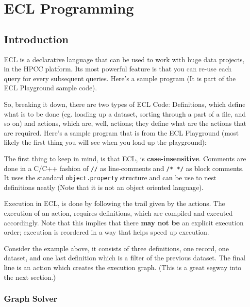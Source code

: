 \part{ECL Programming}

\chapter{Introduction}

ECL is a declarative language that can be used to work with huge data projects, in the HPCC platform. Its most powerful feature is that you can re-use each query for every subsequent queries. Here's a sample program (It is part of the ECL Playground sample code).

So, breaking it down, there are two types of ECL Code: Definitions, which define what is to be done (eg. loading up a dataset, sorting through a part of a file, and so on) and actions, which are, well, actions; they define what are the actions that are required. Here's a sample program that is from the ECL Playground (most likely the first thing you will see when you load up the playground):



The first thing to keep in mind, is that ECL, is \textbf{case-insensitive}. Comments are done in a C/C++ fashion of \lstinline!//! as line-comments and \lstinline!/* */! as block comments. It uses the standard \lstinline!object.property! structure and can be use to nest definitions neatly (Note that it is not an object oriented language).

Execution in ECL, is done by following the trail given by the actions. The execution of an action, requires definitions, which are compiled and executed accordingly. Note that this implies that there \textbf{may not be} an explicit execution order; execution is reordered in a way that helps speed up execution.

Consider the example above, it consists of three definitions, one record, one dataset, and one last definition which is a filter of the previous dataset.
The final line is an action which creates the execution graph. (This is a great segway into the next section.)
\pagebreak
\section{Graph Solver}


        
